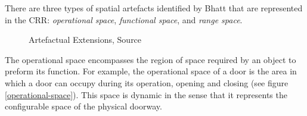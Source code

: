 \documentclass[12pt]{ucthesis}
\begin{document}
There are three types of spatial artefacts identified by Bhatt\cite{Bhatt} that are represented in the CRR: \emph{operational space}, \emph{functional space}, and \emph{range space}.


\begin{figure}[H]
 \centering
 \hspace{7 mm}
 \caption{Artefactual Extensions, Source \cite{bhatt-spatial-computing}}
\label{artefactual-extensions}
\end{figure}


The operational space encompasses the region of space required by an object to preform its function. For example, the operational space of a door is the area in which a door can occupy during its operation, opening and closing (see figure \ref{operational-space}). This space is dynamic in the sense that it represents the configurable space of the physical doorway. 
\end{document}

